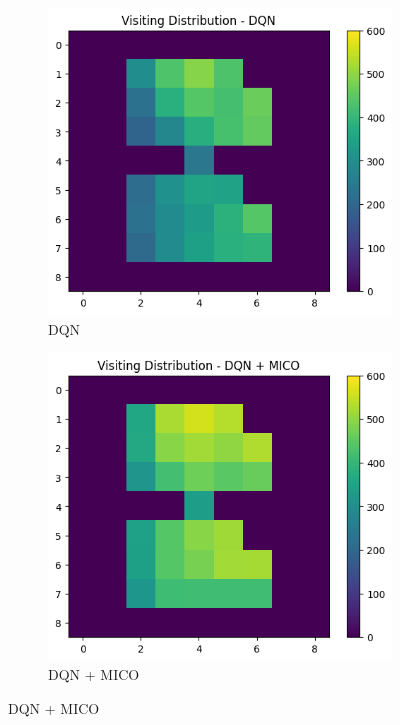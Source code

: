 \begin{figure}[H]
    \centering
    \hspace*{\fill}
    \begin{subfigure}{0.45\textwidth}
        \centering %
        \includegraphics[width=0.70\linewidth]{Results/grid_world/visitation_distribution_dqn.png}
        \caption{DQN}
        \label{fig:visitation_distributions_dqn}
    \end{subfigure}
    \hspace*{\fill} %
    \begin{subfigure}{0.45\textwidth}
        \centering %
        \includegraphics[width=0.70\linewidth]{Results/grid_world/visitation_distribution_dqn_mico.png}
        \caption{DQN + MICO}
        \label{fig:visitation_distributions_mico}
    \end{subfigure}

\end{figure}
